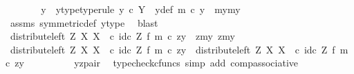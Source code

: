\begin{isabellebody}
\ \ \ \ \isamarkupfalse%
\ \isamarkupfalse%
\ y{\isacharprime}{\kern0pt}\ \ y{\isacharprime}{\kern0pt}{\isacharunderscore}{\kern0pt}type{\isacharbrackleft}{\kern0pt}type{\isacharunderscore}{\kern0pt}rule{\isacharbrackright}{\kern0pt}{\isacharcolon}{\kern0pt}\ {\isachardoublequoteopen}y{\isacharprime}{\kern0pt}\ {\isasymin}\isactrlsub c\ Y{\isachardoublequoteclose}\ \ y{\isacharprime}{\kern0pt}{\isacharunderscore}{\kern0pt}def{\isacharcolon}{\kern0pt}\ {\isachardoublequoteopen}m\ {\isasymcirc}\isactrlsub c\ y{\isacharprime}{\kern0pt}\ {\isacharequal}{\kern0pt}\ {\isasymlangle}my{}{\isacharcomma}{\kern0pt}my{}{\isasymrangle}{\isachardoublequoteclose}\isanewline
\ \ \ \ \ \ \isamarkupfalse%
\ assms\ symmetric{\isacharunderscore}{\kern0pt}def{}\ y{\isacharunderscore}{\kern0pt}type\ \isamarkupfalse%
\ blast\isanewline
\isanewline
\ \ \ \ \isamarkupfalse%
\ {\isachardoublequoteopen}{\isacharparenleft}{\kern0pt}distribute{\isacharunderscore}{\kern0pt}left\ Z\ X\ X\ \ {\isasymcirc}\isactrlsub c\ {\isacharparenleft}{\kern0pt}id\isactrlsub c\ Z\ {\isasymtimes}\isactrlsub f\ m{\isacharparenright}{\kern0pt}{\isacharparenright}{\kern0pt}\ {\isasymcirc}\isactrlsub c\ zy\ {\isacharequal}{\kern0pt}\ {\isasymlangle}{\isasymlangle}z{\isacharcomma}{\kern0pt}my{}{\isasymrangle}{\isacharcomma}{\kern0pt}\ {\isasymlangle}z{\isacharcomma}{\kern0pt}my{}{\isasymrangle}{\isasymrangle}{\isachardoublequoteclose}\isanewline
\ \ \ \ \isamarkupfalse%
\ {\isacharminus}{\kern0pt}\isanewline
\ \ \ \ \ \ \isamarkupfalse%
\ {\isachardoublequoteopen}{\isacharparenleft}{\kern0pt}distribute{\isacharunderscore}{\kern0pt}left\ Z\ X\ X\ \ {\isasymcirc}\isactrlsub c\ {\isacharparenleft}{\kern0pt}id\isactrlsub c\ Z\ {\isasymtimes}\isactrlsub f\ m{\isacharparenright}{\kern0pt}{\isacharparenright}{\kern0pt}\ {\isasymcirc}\isactrlsub c\ zy\ {\isacharequal}{\kern0pt}\ distribute{\isacharunderscore}{\kern0pt}left\ Z\ X\ X\ \ {\isasymcirc}\isactrlsub c\ {\isacharparenleft}{\kern0pt}id\isactrlsub c\ Z\ {\isasymtimes}\isactrlsub f\ m{\isacharparenright}{\kern0pt}\ {\isasymcirc}\isactrlsub c\ zy{\isachardoublequoteclose}\isanewline
\ \ \ \ \ \ \ \ \isamarkupfalse%
\ yz{\isacharunderscore}{\kern0pt}pair\ \isamarkupfalse%
\ {\isacharparenleft}{\kern0pt}typecheck{\isacharunderscore}{\kern0pt}cfuncs{\isacharcomma}{\kern0pt}\ simp\ add{\isacharcolon}{\kern0pt}\ comp{\isacharunderscore}{\kern0pt}associative{}{\isacharparenright}{\kern0pt}\isanewline

\end{isabellebody}
